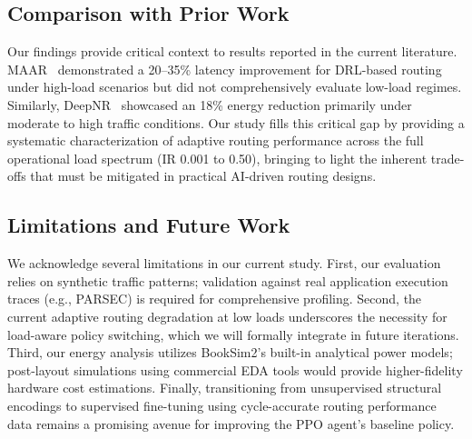 \subsection{Comparison with Prior Work}

Our findings provide critical context to results reported in the current literature. MAAR~\cite{wang2022maar} demonstrated a 20--35\% latency improvement for DRL-based routing under high-load scenarios but did not comprehensively evaluate low-load regimes. Similarly, DeepNR~\cite{deepnr2022} showcased an 18\% energy reduction primarily under moderate to high traffic conditions. Our study fills this critical gap by providing a systematic characterization of adaptive routing performance across the full operational load spectrum (IR 0.001 to 0.50), bringing to light the inherent trade-offs that must be mitigated in practical AI-driven routing designs.

\subsection{Limitations and Future Work}

We acknowledge several limitations in our current study. First, our evaluation relies on synthetic traffic patterns; validation against real application execution traces (e.g., PARSEC) is required for comprehensive profiling. Second, the current adaptive routing degradation at low loads underscores the necessity for load-aware policy switching, which we will formally integrate in future iterations. Third, our energy analysis utilizes BookSim2's built-in analytical power models; post-layout simulations using commercial EDA tools would provide higher-fidelity hardware cost estimations. Finally, transitioning from unsupervised structural encodings to supervised fine-tuning using cycle-accurate routing performance data remains a promising avenue for improving the PPO agent's baseline policy.
